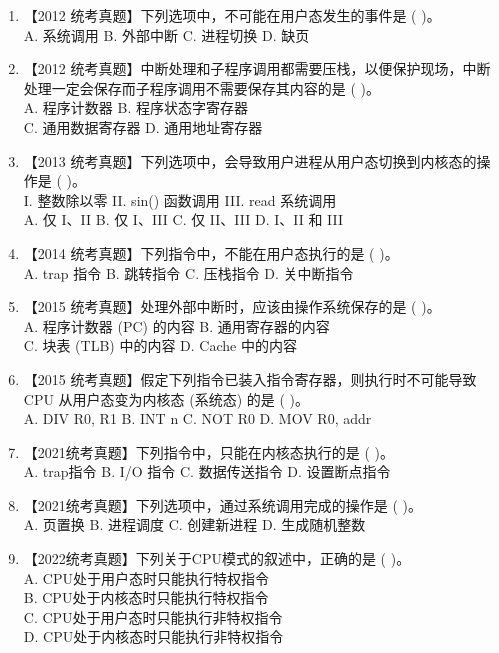 \documentclass[lang=cn,newtx,10pt,scheme=chinese]{../../elegantbook}
\begin{document}
\begin{enumerate}
    \item 【2012 统考真题】下列选项中，不可能在用户态发生的事件是 (    )。\\
    A. 系统调用 \quad B. 外部中断 \quad C. 进程切换 \quad D. 缺页

    \item 【2012 统考真题】中断处理和子程序调用都需要压栈，以便保护现场，中断处理一定会保存而子程序调用不需要保存其内容的是 (    )。\\
    A. 程序计数器 \quad B. 程序状态字寄存器\\
    C. 通用数据寄存器 \quad D. 通用地址寄存器

    \item 【2013 统考真题】下列选项中，会导致用户进程从用户态切换到内核态的操作是 (    )。\\
    I. 整数除以零 \quad II. sin() 函数调用 \quad III. read 系统调用\\
    A. 仅 I、II \quad B. 仅 I、III \quad C. 仅 II、III \quad D. I、II 和 III

    \item 【2014 统考真题】下列指令中，不能在用户态执行的是 (    )。\\
    A. trap 指令 \quad B. 跳转指令 \quad C. 压栈指令 \quad D. 关中断指令

    \item 【2015 统考真题】处理外部中断时，应该由操作系统保存的是 (    )。\\
    A. 程序计数器 (PC) 的内容 \quad B. 通用寄存器的内容\\
    C. 块表 (TLB) 中的内容 \quad D. Cache 中的内容

    \item 【2015 统考真题】假定下列指令已装入指令寄存器，则执行时不可能导致 CPU 从用户态变为内核态 (系统态) 的是 (    )。\\
    A. DIV R0, R1 \quad B. INT n \quad C. NOT R0 \quad D. MOV R0, addr

    \item 【2021统考真题】下列指令中，只能在内核态执行的是 (    )。\\
    A. trap指令 \quad B. I/O 指令 \quad C. 数据传送指令 \quad D. 设置断点指令

    \item 【2021统考真题】下列选项中，通过系统调用完成的操作是 (    )。\\
    A. 页置换 \quad B. 进程调度 \quad C. 创建新进程 \quad D. 生成随机整数

    \item 【2022统考真题】下列关于CPU模式的叙述中，正确的是 (    )。\\
    A. CPU处于用户态时只能执行特权指令\\
    B. CPU处于内核态时只能执行特权指令\\
    C. CPU处于用户态时只能执行非特权指令\\
    D. CPU处于内核态时只能执行非特权指令


\end{enumerate}
\end{document}
